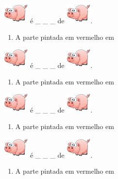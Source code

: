 \documentclass[a4,12pt]{book}
\begin{document}
\includegraphics[height=30pt, keepaspectratio]{pig} é \_ \_ \_   de \includegraphics[height=30pt, keepaspectratio]{pig}.
\begin{enumerate} [\quad a)] %
  \item     A parte pintada em vermelho em
\end{enumerate} %
\includegraphics[height=30pt, keepaspectratio]{pig} é \_ \_ \_   de \includegraphics[height=30pt, keepaspectratio]{pig}.
\begin{enumerate} [\quad a)] %
  \item     A parte pintada em vermelho em
\end{enumerate} %
\includegraphics[height=30pt, keepaspectratio]{pig} é \_ \_ \_   de \includegraphics[height=30pt, keepaspectratio]{pig}.
\begin{enumerate} [\quad a)] %
  \item     A parte pintada em vermelho em
\end{enumerate} %
\includegraphics[height=30pt, keepaspectratio]{pig} é \_ \_ \_   de \includegraphics[height=30pt, keepaspectratio]{pig}.
\begin{enumerate} [\quad a)] %
  \item     A parte pintada em vermelho em
\end{enumerate} %
\end{document}
